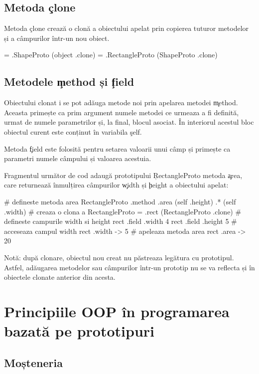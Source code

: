 \documentclass[12pt,a4paper]{memoir}
\begin{document}
\subsection{Metoda \c{clone}}

Metoda \c{clone} crează o clonă a obiectului apelat prin copierea tuturor metodelor și a câmpurilor într-un nou obiect. 
\begin{code}
= .ShapeProto (object .clone)
= .RectangleProto (ShapeProto .clone)
\end{code}

\subsection{Metodele \c{method} și \c{field}}

Obiectului clonat i se pot adăuga metode noi prin apelarea metodei \c{method}. Aceasta primește ca prim argument numele metodei ce urmeaza a fi definită, urmat de numele parametrilor și, la final, blocul asociat. În interiorul acestul bloc obiectul curent este conținut în variabila \c{self}.

Metoda \c{field} este folosită pentru setarea valoarii unui câmp și primește ca parametri numele câmpului și valoarea acestuia.

Fragmentul următor de cod adaugă prototipului \c{RectangleProto} metoda \c{area}, care returnează înmulțirea câmpurilor \c{width} și \c{height} a obiectului apelat:
\begin{code}
# defineste metoda area 
RectangleProto .method .area { 
  (self .height) .* (self .width)
}
# creaza o clona a RectangleProto
= .rect (RectangleProto .clone)
# defineste campurile width si height
rect .field .width 4
rect .field .height 5
# acceseaza campul width
rect .width
  -> 5
# apeleaza metoda area
rect .area
  -> 20
\end{code}

Notă: după clonare, obiectul nou creat nu păstreaza legătura cu prototipul. Astfel, adăugarea metodelor sau câmpurilor într-un prototip nu se va reflecta și în obiectele clonate anterior din acesta.

\section{Principiile OOP în programarea bazată pe prototipuri}

\subsection{Moșteneria}
\end{document}
